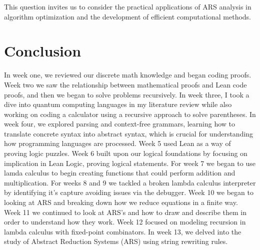 \documentclass{article}
\begin{document}
This question invites us to consider the practical applications of ARS analysis in algorithm optimization and the development of efficient computational methods.   
\section*{Conclusion}
In week one, we reviewed our discrete math knowledge and began coding proofs. Week two we saw the relationship between mathematical proofs and Lean code proofs, and then we began to solve problems recursively. In week three, I took a dive into quantum computing languages in my literature review while also working on coding a calculator using a recursive approach to solve parentheses. In week four, we explored parsing and context-free grammars, learning how to translate concrete syntax into abstract syntax, which is crucial for understanding how programming languages are processed. Week 5 used Lean as a way of proving logic puzzles. Week 6 built upon our logical foundations by focusing on implication in Lean Logic, proving logical statements. For week 7 we began to use lamda calculus to begin creating functions that could perform addition and multiplication. For weeks 8 and 9 we tackled a broken lambda calculus interpreter by identifying it's capture avoiding issues via the debugger. Week 10 we began to looking at ARS and breaking down how we reduce equations in a finite way. Week 11 we continued to look at ARS's and how to draw and describe them in order to understand how they work. Week 12 focused on modeling recursion in lambda calculus with fixed-point combinators. In week 13, we delved into the study of Abstract Reduction Systems (ARS) using string rewriting rules.
\end{document}
